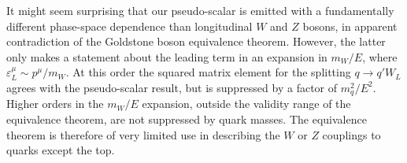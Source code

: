 It might seem surprising that our pseudo-scalar is emitted with a
fundamentally different phase-space dependence than longitudinal $W$
and $Z$ bosons, in apparent contradiction of the Goldstone boson
equivalence theorem.  However, the latter only makes a statement about
the leading term in an expansion in $m_W / E$, where 
$\varepsilon^\mu_L \sim p^\mu / m_W$. At this order the squared matrix
element for the splitting $q \to q' W_L$ agrees with the pseudo-scalar
result, but is suppressed by a factor of $m_q^2 / E^2$. Higher orders
in the $m_W/E$ expansion, outside the validity range of the
equivalence theorem, are not suppressed by quark masses.  The
equivalence theorem is therefore of very limited use in describing the
$W$ or $Z$ couplings to quarks except the top.


